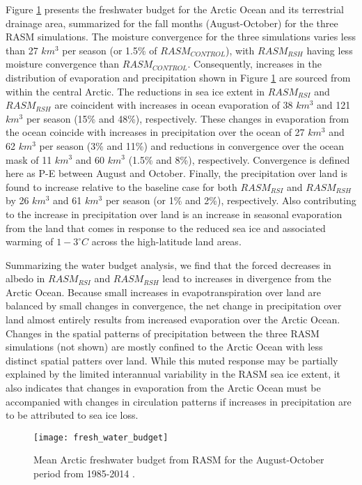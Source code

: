 Figure \ref{fig:fwb} presents the freshwater budget for the Arctic Ocean and its terrestrial drainage area, summarized for the fall months (August-October) for the three RASM simulations.
The  moisture convergence for the three simulations varies less than 27 $km^3$ per season (or 1.5\% of $RASM_{CONTROL}$), with $RASM_{RSH}$ having less moisture convergence than $RASM_{CONTROL}$.
Consequently, increases in the distribution of evaporation and precipitation shown in Figure \ref{fig:fwb} are sourced from within the central Arctic.
The reductions in sea ice extent in $RASM_{RSI}$ and $RASM_{RSH}$ are coincident with increases in ocean evaporation of 38 $km^3$ and 121 $km^3$ per season (15\% and 48\%), respectively.
These changes in evaporation from the ocean coincide with increases in precipitation over the ocean of 27 $km^3$ and 62 $km^3$ per season (3\% and 11\%) and reductions in convergence over the ocean mask of 11 $km^3$ and 60 $km^3$ (1.5\% and 8\%), respectively.
Convergence is defined here as P-E between August and October.
Finally, the precipitation over land is found to increase relative to the baseline case for both $RASM_{RSI}$ and $RASM_{RSH}$ by 26 $km^3$ and 61 $km^3$ per season (or 1\% and 2\%), respectively.
Also contributing to the increase in precipitation over land is an increase in seasonal evaporation from the land that comes in response to the reduced sea ice and associated warming of $1-3^{\circ}C$ across the high-latitude land areas.

Summarizing the water budget analysis, we find that the forced decreases in albedo in $RASM_{RSI}$ and $RASM_{RSH}$ lead to increases in divergence from the Arctic Ocean. %
Because small increases in evapotranspiration over land are balanced by small changes in convergence, the net change in precipitation over land almost entirely results from increased evaporation over the Arctic Ocean.
Changes in the spatial patterns of precipitation between the three RASM simulations (not shown) are mostly confined to the Arctic Ocean with less distinct spatial patters over land.
While this muted response may be partially explained by the limited interannual variability in the RASM sea ice extent, it also indicates that changes in evaporation from the Arctic Ocean must be accompanied with changes in circulation patterns if increases in precipitation are to be attributed to sea ice loss.

\begin{figure}
  \centering
  \texttt{[image: fresh\_water\_budget]}
  \caption{Mean Arctic freshwater budget from RASM for the August-October period from 1985-2014 \citep[adapted from][]{Serreze_2006a}.}
  \label{fig:fwb}
\end{figure}

